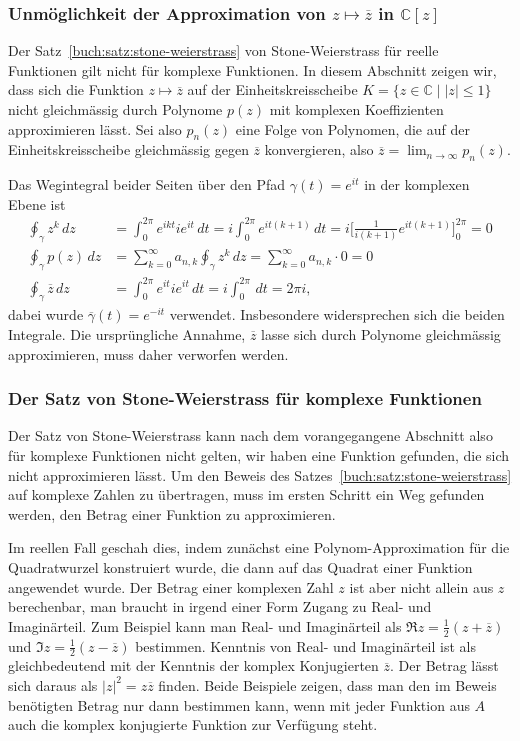 \subsubsection{Unmöglichkeit der Approximation von $z\mapsto \overline{z}$
in $\mathbb{C}[z]$}
Der Satz~\ref{buch:satz:stone-weierstrass} von Stone-Weierstrass für
reelle Funktionen gilt nicht für komplexe Funktionen.
In diesem Abschnitt zeigen wir, dass sich die Funktion $z\mapsto\overline{z}$
auf der Einheitskreisscheibe $K=\{z\in\mathbb{C}\;|\; |z|\le 1\}$ nicht
gleichmässig durch Polynome $p(z)$ mit komplexen Koeffizienten approximieren
lässt.
Sei also $p_n(z)$ eine Folge von Polynomen, die auf der Einheitskreisscheibe
gleichmässig gegen $\overline{z}$ konvergieren, also
$\overline{z}=\lim_{n\to\infty}p_n(z)$.

Das Wegintegral beider Seiten über den Pfad $\gamma(t) = e^{it}$
in der komplexen Ebene ist
\begin{align*}
\oint_\gamma z^k\,dz
&=
\int_0^{2\pi} e^{ikt} ie^{it}\,dt
=
i\int_0^{2\pi} e^{it(k+1)}\,dt
=
i\biggl[ \frac{1}{i(k+1)} e^{it(k+1)}\biggr]_0^{2\pi}
=
0
\\
\oint_\gamma
p(z)
\,dz
&=
\sum_{k=0}^\infty a_{n,k} \oint_\gamma z^k\,dz
=
\sum_{k=0}^\infty a_{n,k}\cdot 0
=
0
\\
\oint_\gamma \overline{z}\,dz
&=
\int_0^{2\pi} e^{it} ie^{it}\,dt
=
i\int_0^{2\pi} \,dt = 2\pi i,
\end{align*}
dabei wurde $\overline{\gamma}(t)=e^{-it}$ verwendet.
Insbesondere widersprechen sich die beiden Integrale.
Die ursprüngliche Annahme, $\overline{z}$ lasse sich durch Polynome
gleichmässig approximieren, muss daher verworfen werden.

\subsubsection{Der Satz von Stone-Weierstrass für komplexe Funktionen}
Der Satz von Stone-Weierstrass kann nach dem vorangegangene Abschnitt
also für komplexe Funktionen nicht gelten, wir haben eine Funktion
gefunden, die sich nicht approximieren lässt.
Um den Beweis des Satzes~\ref{buch:satz:stone-weierstrass}
auf komplexe Zahlen zu übertragen, muss im ersten Schritt ein Weg
gefunden werden, den Betrag einer Funktion zu approximieren.

Im reellen Fall geschah dies, indem zunächst eine Polynom-Approximation
für die Quadratwurzel konstruiert wurde, die dann auf das Quadrat einer
Funktion angewendet wurde.
Der Betrag einer komplexen Zahl $z$ ist aber nicht allein aus $z$
berechenbar, man braucht in irgend einer Form Zugang zu Real-
und Imaginärteil.
Zum Beispiel kann man Real- und Imaginärteil als
$\Re z= \frac12(z+\overline{z})$ und $\Im z = \frac12(z-\overline{z})$
bestimmen.
Kenntnis von Real- und Imaginärteil ist als gleichbedeutend mit
der Kenntnis der komplex Konjugierten $\overline{z}$.
Der Betrag lässt sich daraus als $|z|^2 = z\overline{z}$ finden.
Beide Beispiele zeigen, dass man den im Beweis benötigten Betrag
nur dann bestimmen kann, wenn mit jeder Funktion aus $A$ auch die
komplex konjugierte Funktion zur Verfügung steht.

